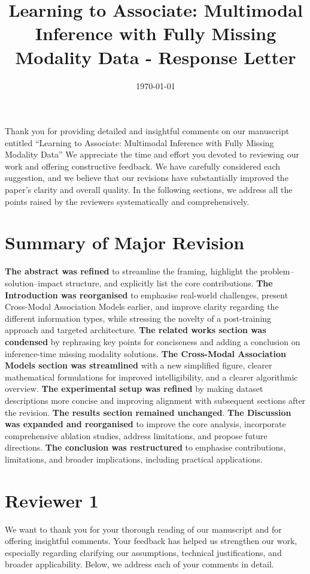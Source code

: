 \documentclass{article}
\title{Learning to Associate: Multimodal Inference with Fully Missing Modality Data - Response Letter}
\author{}
\date{\today}
\begin{document}
\maketitle

\noindent Thank you for providing detailed and insightful comments on our manuscript entitled ``Learning to Associate: Multimodal Inference with Fully Missing Modality Data” We appreciate the time and effort you devoted to reviewing our work and offering constructive feedback. We have carefully considered each suggestion, and we believe that our revisions have substantially improved the paper's clarity and overall quality. In the following sections, we address all the points raised by the reviewers systematically and comprehensively.

\section*{Summary of Major Revision}
\noindent \textbf{The abstract was refined} to streamline the framing, highlight the problem--solution--impact structure, and explicitly list the core contributions.
\textbf{The Introduction was reorganised} to emphasise real-world challenges, present Cross-Modal Association Models earlier, and improve clarity regarding the different information types, while stressing the novelty of a post-training approach and targeted architecture.
\textbf{The related works section was condensed} by rephrasing key points for conciseness and adding a conclusion on inference-time missing modality solutions.
\textbf{The Cross-Modal Association Models section was streamlined} with a new simplified figure, clearer mathematical formulations for improved intelligibility, and a clearer algorithmic overview.
\textbf{The experimental setup was refined} by making dataset descriptions more concise and improving alignment with subsequent sections after the revision.
\textbf{The results section remained unchanged}.
\textbf{The Discussion was expanded and reorganised} to improve the core analysis, incorporate comprehensive ablation studies, address limitations, and propose future directions.
\textbf{The conclusion was restructured} to emphasise contributions, limitations, and broader implications, including practical applications.

\section*{Reviewer 1}
We want to thank you for your thorough reading of our manuscript and for offering insightful comments. Your feedback has helped us strengthen our work, especially regarding clarifying our assumptions, technical justifications, and broader applicability. Below, we address each of your comments in detail.
\end{document}
